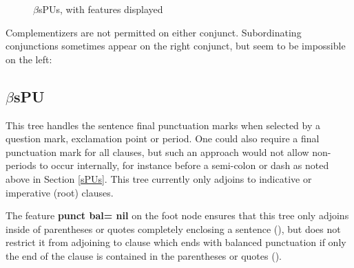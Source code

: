 \begin{figure}[hbt]
\centering
\hspace{0.0in}
\caption{$\beta$sPUs, with features displayed}
\label{sPUs-tree}
\end{figure}

Complementizers are not permitted on either conjunct. Subordinating
conjunctions sometimes appear on the right conjunct, but seem to be
impossible on the left:
	




\subsection{$\beta$sPU}

This tree handles the sentence final punctuation marks when selected
by a question mark, exclamation point or period. One could also
require a final punctuation mark for all clauses, but such an approach
would not allow non-periods to occur internally, for instance before a
semi-colon or dash as noted above in Section \ref{sPUs}. This tree
currently only adjoins to indicative or imperative (root) clauses.


The feature {\bf punct bal= nil} on the foot node ensures that this
tree only adjoins inside of parentheses or quotes completely enclosing
a sentence (), but does not restrict it from adjoining to clause
which ends with balanced punctuation if only the end of the clause is
contained in the parentheses or quotes ().

